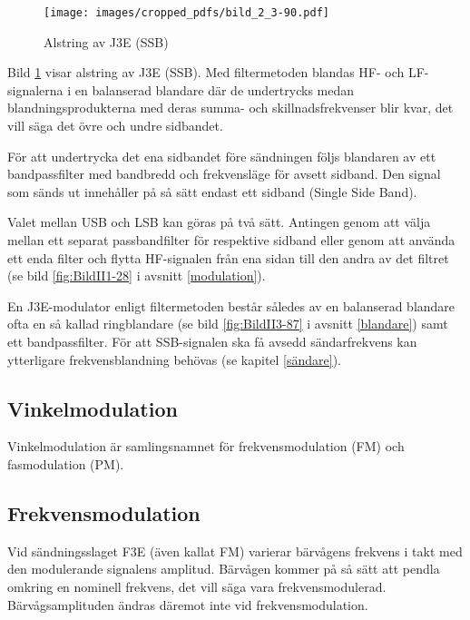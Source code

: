 \begin{figure}
\texttt{[image: images/cropped\_pdfs/bild\_2\_3-90.pdf]}
\caption{Alstring av J3E (SSB)}
\label{fig:BildII3-90}
\end{figure}

Bild \ref{fig:BildII3-90} visar alstring av J3E (SSB).
Med filtermetoden blandas HF- och LF-signalerna i en balanserad blandare där de
undertrycks medan blandningsprodukterna med deras summa- och
skillnadsfrekvenser blir kvar, det vill säga det övre och undre sidbandet.

För att undertrycka det ena sidbandet före sändningen följs blandaren
av ett bandpassfilter med bandbredd och frekvensläge för avsett sidband.
Den signal som sänds ut innehåller på så sätt endast ett sidband (Single Side
Band).

Valet mellan USB och LSB kan göras på två sätt.
Antingen genom att välja mellan ett separat passbandfilter för respektive
sidband eller genom att använda ett enda filter och flytta HF-signalen från ena
sidan till den andra av det filtret (se bild \ref{fig:BildII1-28} i
avsnitt \ref{modulation}).

En J3E-modulator enligt filtermetoden består således av en balanserad blandare
ofta en så kallad ringblandare (se bild \ref{fig:BildII3-87} i avsnitt
\ref{blandare}) samt ett bandpassfilter.
För att SSB-signalen ska få avsedd sändarfrekvens kan ytterligare
frekvensblandning behövas (se kapitel \ref{sändare}).

\subsection{Vinkelmodulation}

Vinkelmodulation är samlingsnamnet för frekvensmodulation (FM) och
fasmodulation (PM).

\subsection{Frekvensmodulation}

Vid sändningsslaget F3E (även kallat FM) varierar bärvågens frekvens i
takt med den modulerande signalens amplitud.
Bärvågen kommer på så sätt att pendla omkring en nominell frekvens, det vill
säga vara frekvensmodulerad.
Bärvågsamplituden ändras däremot inte vid frekvensmodulation.

